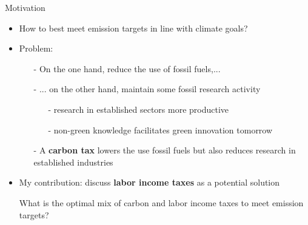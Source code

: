 \documentclass[11pt,aspectratio=169]{beamer}
\begin{document}
\addtocounter{framenumber}{-1}
\begin{frame}{Motivation}
	\begin{itemize}[<+-| alert@+>]
		\item How to best meet emission targets in line with climate goals? %
		\vspace{3mm}
		\item Problem:
		\begin{itemize}
			\item[-] On the one hand,  reduce the use of fossil fuels,...
			\vspace{2mm}
			\item[-] ... on the other hand, %
			maintain some fossil research activity 
			\vspace{1mm}
			\begin{enumerate}
				\item[-] research in established sectors more productive
				\item[-] non-green knowledge facilitates green innovation tomorrow %
			\end{enumerate}%
			\vspace{2mm}				
			\item[-] A \textbf{carbon tax} lowers the use fossil fuels but also reduces research in established industries %
		\end{itemize} 
		\vspace{3mm}
		\item My contribution: discuss \textbf{labor income taxes} as a potential solution
		\vspace{3mm}
		\item[] \hspace{-4mm}\alert{{What is the optimal mix of carbon and labor income taxes to meet emission targets?}}
	\end{itemize}
\end{frame}
\end{document}
